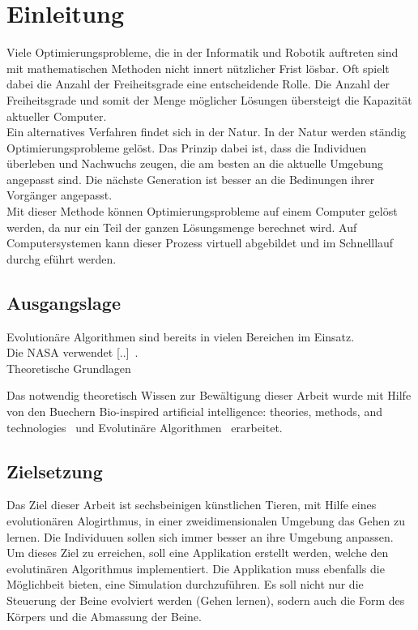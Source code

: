 %
%


\chapter{Einleitung}

  Viele Optimierungsprobleme,
  die in der Informatik und Robotik auftreten sind mit mathematischen Methoden nicht innert nützlicher Frist lösbar.
  Oft spielt dabei die Anzahl der Freiheitsgrade eine entscheidende Rolle.
  Die Anzahl der Freiheitsgrade und somit der Menge möglicher Lösungen übersteigt die Kapazität aktueller Computer.
  \\
  Ein alternatives Verfahren findet sich in der Natur. In der Natur werden ständig Optimierungsprobleme gelöst.
  Das Prinzip dabei ist, dass die Individuen überleben und Nachwuchs zeugen,
  die am besten an die aktuelle Umgebung angepasst sind.
  Die nächste Generation ist besser an die Bedinungen ihrer Vorgänger angepasst. %
  \\
  Mit dieser Methode können Optimierungsprobleme auf einem Computer gelöst werden,
  da nur ein Teil der ganzen Lösungsmenge berechnet wird.
  Auf Computersystemen kann dieser Prozess virtuell abgebildet und im Schnelllauf durchg eführt werden.
  \\

  \section{Ausgangslage}


    Evolutionäre Algorithmen sind bereits in vielen Bereichen im Einsatz.
    \\
    Die NASA verwendet [..]~\cite{Hornby2006}.
    \\
    Theoretische Grundlagen

    Das notwendig theoretisch Wissen zur Bewältigung dieser Arbeit wurde mit Hilfe von den Buechern
    Bio-inspired artificial intelligence: theories, methods, and technologies~\cite{book:bioInspired} und
    Evolutinäre Algorithmen~\cite{book:evAlgo} erarbeitet.


\section{Zielsetzung}
  Das Ziel dieser Arbeit ist sechsbeinigen künstlichen Tieren, mit Hilfe eines evolutionären Alogirthmus, in einer zweidimensionalen Umgebung das Gehen zu lernen.
  Die Individuuen sollen sich immer besser an ihre Umgebung anpassen.
  Um dieses Ziel zu erreichen, soll eine Applikation erstellt werden, welche den evolutinären Algorithmus implementiert.
  Die Applikation muss ebenfalls die Möglichbeit bieten, eine Simulation durchzuführen.
  Es soll nicht nur die Steuerung der Beine evolviert werden (Gehen lernen), sodern auch die Form des Körpers und die Abmassung der Beine.

